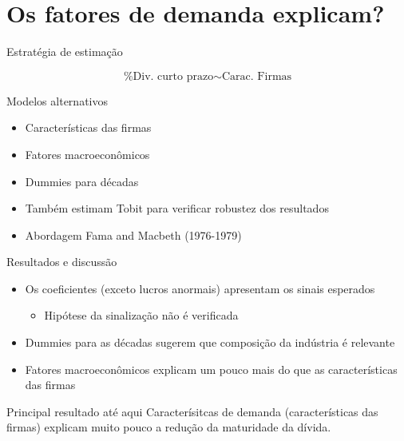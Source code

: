 \documentclass[presentation]{beamer}
\begin{document}
\section{Os fatores de demanda explicam?}
\label{sec:orgba1ed01}

\begin{frame}[label={sec:orge8b1671}]{Estratégia de estimação}
\begin{latex}
\begin{equation}
\text{\% Div. curto prazo} \sim \text{Carac. Firmas}
\end{equation}
\end{latex}

\begin{block}{Modelos alternativos}
\begin{itemize}
\item Características das firmas
\item Fatores macroeconômicos
\item Dummies para décadas
\item Também estimam Tobit para verificar robustez dos resultados
\item Abordagem Fama and Macbeth (1976-1979)
\end{itemize}
\end{block}
\end{frame}

\begin{frame}[label={sec:org64e1dcf}]{Resultados e discussão}
\begin{itemize}
\item Os coeficientes (exceto lucros anormais) apresentam os sinais esperados
\begin{itemize}
\item Hipótese da sinalização não é verificada
\end{itemize}
\item Dummies para as décadas sugerem que composição da indústria é relevante
\item Fatores macroeconômicos explicam um pouco mais do que as características das firmas
\end{itemize}


\begin{block}{Principal resultado até aqui}
Caracterísitcas de demanda (características das firmas) explicam muito pouco a redução da maturidade da dívida.
\end{block}
\end{frame}
\end{document}
